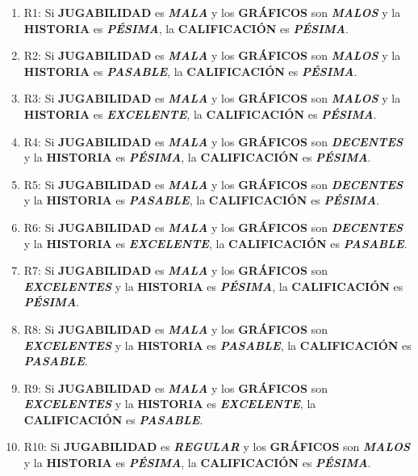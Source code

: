 \documentclass[11pt, letterpaper]{article}
\begin{document}
\begin{enumerate}
	\item R1: Si \textbf{JUGABILIDAD} es \textbf{\textit{MALA}} y los \textbf{GRÁFICOS} son \textbf{\textit{MALOS}} y la \textbf{HISTORIA} es \textbf{\textit{PÉSIMA}}, la \textbf{CALIFICACIÓN} es \textbf{\textit{PÉSIMA}}.
	\item R2: Si \textbf{JUGABILIDAD} es \textbf{\textit{MALA}} y los \textbf{GRÁFICOS} son \textbf{\textit{MALOS}} y la \textbf{HISTORIA} es \textbf{\textit{PASABLE}}, la \textbf{CALIFICACIÓN} es \textbf{\textit{PÉSIMA}}.
	\item R3: Si \textbf{JUGABILIDAD} es \textbf{\textit{MALA}} y los \textbf{GRÁFICOS} son \textbf{\textit{MALOS}} y la \textbf{HISTORIA} es \textbf{\textit{EXCELENTE}}, la \textbf{CALIFICACIÓN} es \textbf{\textit{PÉSIMA}}.
	\item R4: Si \textbf{JUGABILIDAD} es \textbf{\textit{MALA}} y los \textbf{GRÁFICOS} son \textbf{\textit{DECENTES}} y la \textbf{HISTORIA} es \textbf{\textit{PÉSIMA}}, la \textbf{CALIFICACIÓN} es \textbf{\textit{PÉSIMA}}.
	\item R5: Si \textbf{JUGABILIDAD} es \textbf{\textit{MALA}} y los \textbf{GRÁFICOS} son \textbf{\textit{DECENTES}} y la \textbf{HISTORIA} es \textbf{\textit{PASABLE}}, la \textbf{CALIFICACIÓN} es \textbf{\textit{PÉSIMA}}.
	\item R6: Si \textbf{JUGABILIDAD} es \textbf{\textit{MALA}} y los \textbf{GRÁFICOS} son \textbf{\textit{DECENTES}} y la \textbf{HISTORIA} es \textbf{\textit{EXCELENTE}}, la \textbf{CALIFICACIÓN} es \textbf{\textit{PASABLE}}.
	\item R7: Si \textbf{JUGABILIDAD} es \textbf{\textit{MALA}} y los \textbf{GRÁFICOS} son \textbf{\textit{EXCELENTES}} y la \textbf{HISTORIA} es \textbf{\textit{PÉSIMA}}, la \textbf{CALIFICACIÓN} es \textbf{\textit{PÉSIMA}}.
	\item R8: Si \textbf{JUGABILIDAD} es \textbf{\textit{MALA}} y los \textbf{GRÁFICOS} son \textbf{\textit{EXCELENTES}} y la \textbf{HISTORIA} es \textbf{\textit{PASABLE}}, la \textbf{CALIFICACIÓN} es \textbf{\textit{PASABLE}}.
	\item R9: Si \textbf{JUGABILIDAD} es \textbf{\textit{MALA}} y los \textbf{GRÁFICOS} son \textbf{\textit{EXCELENTES}} y la \textbf{HISTORIA} es \textbf{\textit{EXCELENTE}}, la \textbf{CALIFICACIÓN} es \textbf{\textit{PASABLE}}.
	\item R10: Si \textbf{JUGABILIDAD} es \textbf{\textit{REGULAR}} y los \textbf{GRÁFICOS} son \textbf{\textit{MALOS}} y la \textbf{HISTORIA} es \textbf{\textit{PÉSIMA}}, la \textbf{CALIFICACIÓN} es \textbf{\textit{PÉSIMA}}.

\end{enumerate}
\end{document}

